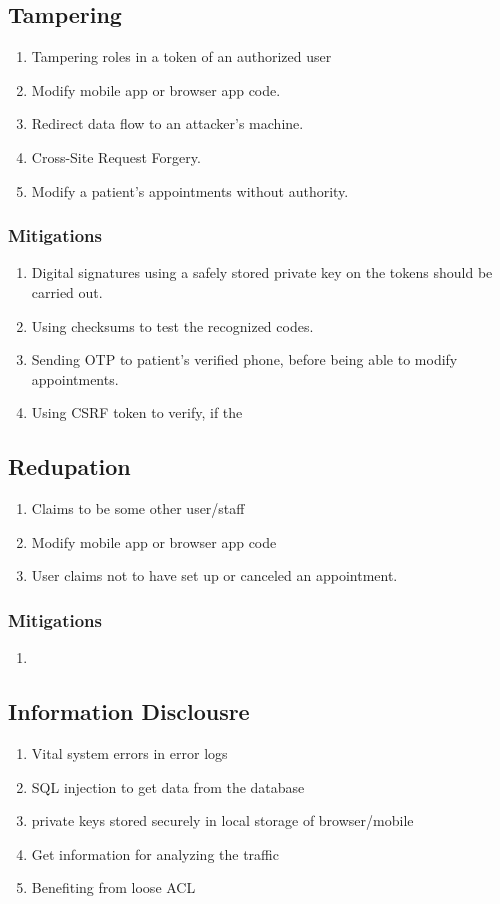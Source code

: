 \subsection{Tampering}
\begin{enumerate}    
  \item Tampering roles in a token of an authorized user
  \item Modify mobile app or browser app code.
   \item Redirect data flow to an attacker's machine.
   \item Cross-Site Request Forgery.
   \item Modify a patient's appointments without authority.
\end{enumerate}
\subsubsection{Mitigations}
\begin{enumerate}
    \item Digital signatures using a safely stored private key on the tokens should be carried out.
    \item Using checksums to test the recognized codes.
    \item Sending OTP to patient's verified phone, before being able to modify appointments.
    \item Using CSRF token to verify, if the 
\end{enumerate}

\subsection{Redupation}
\begin{enumerate}    
  \item Claims to be some other user/staff
  \item Modify mobile app or browser app code
  \item User claims not to have set up or canceled an appointment.
\end{enumerate}

\subsubsection{Mitigations}
\begin{enumerate}
    \item 
\end{enumerate}

\subsection{Information Disclousre}
\begin{enumerate}
    \item Vital system errors in error logs
    \item SQL injection to get data from the database
    \item private keys stored securely in local storage of browser/mobile
    \item Get information for analyzing the traffic
    \item Benefiting from loose ACL
\end{enumerate}

